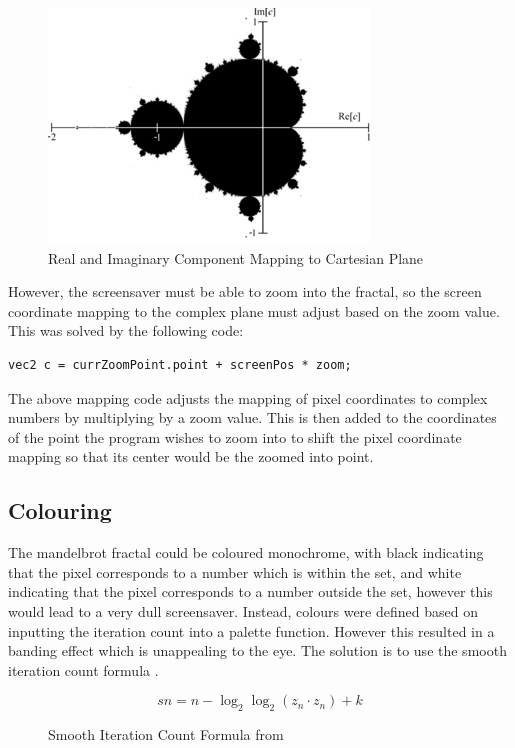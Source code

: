 \documentclass[10pt, openany]{book}
\begin{document}
\begin{figure}[H]
	\centering
	\includegraphics[width=0.4\linewidth]{MandelbrotAxis}
	\caption{Real and Imaginary Component Mapping to Cartesian Plane}
	\label{fig:mandelbrot-axis}
\end{figure}	

However, the screensaver must be able to zoom into the fractal, so the screen coordinate mapping to the complex plane must adjust based on the zoom value. This was solved by the following code:

\begin{verbatim}
vec2 c = currZoomPoint.point + screenPos * zoom;
\end{verbatim}

The above mapping code adjusts the mapping of pixel coordinates to complex numbers by multiplying by a zoom value. This is then added to the coordinates of the point the program wishes to zoom into to shift the pixel coordinate mapping so that its center would be the zoomed into point.

\subsection{Colouring}

The mandelbrot fractal could be coloured monochrome, with black indicating that the pixel corresponds to a number which is within the set, and white indicating that the pixel corresponds to a number outside the set, however this would lead to a very dull screensaver. Instead, colours were defined based on inputting the iteration count into a palette function. However this resulted in a banding effect which is unappealing to the eye. The solution is to use the smooth iteration count formula \citep{quilez-smooth}.

\begin{figure}[H]
	\centering
	\[ sn = n - \log_2\log_2(z_n \cdot z_n) + k \]
	\caption{Smooth Iteration Count Formula from \citep{quilez-smooth}}
	\label{fig:smooth-iter}
\end{figure}
\end{document}
